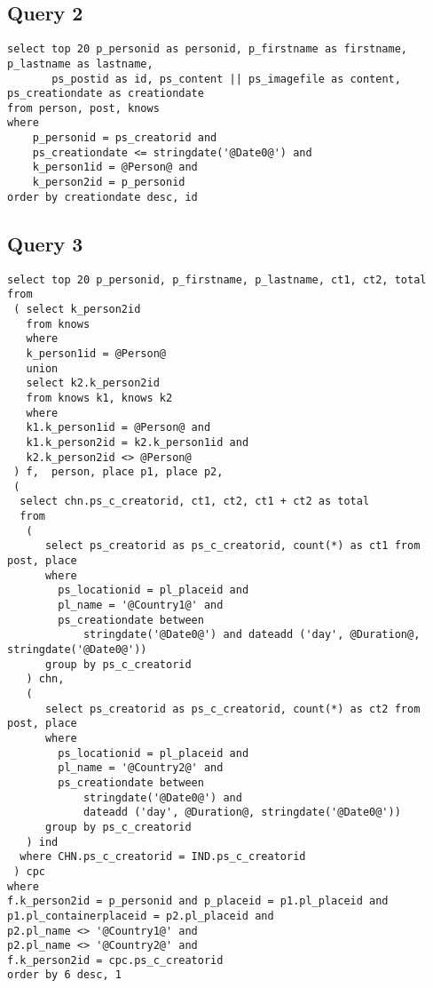 \subsection{Query 2}
\begin{verbatim}
select top 20 p_personid as personid, p_firstname as firstname, p_lastname as lastname,
       ps_postid as id, ps_content || ps_imagefile as content, ps_creationdate as creationdate
from person, post, knows
where
    p_personid = ps_creatorid and
    ps_creationdate <= stringdate('@Date0@') and
    k_person1id = @Person@ and
    k_person2id = p_personid
order by creationdate desc, id
\end{verbatim}

\subsection{Query 3}

\begin{verbatim}
select top 20 p_personid, p_firstname, p_lastname, ct1, ct2, total
from
 ( select k_person2id
   from knows
   where
   k_person1id = @Person@
   union
   select k2.k_person2id
   from knows k1, knows k2
   where
   k1.k_person1id = @Person@ and 
   k1.k_person2id = k2.k_person1id and 
   k2.k_person2id <> @Person@
 ) f,  person, place p1, place p2,
 (
  select chn.ps_c_creatorid, ct1, ct2, ct1 + ct2 as total
  from
   (
      select ps_creatorid as ps_c_creatorid, count(*) as ct1 from post, place
      where
        ps_locationid = pl_placeid and 
        pl_name = '@Country1@' and
        ps_creationdate between 
            stringdate('@Date0@') and dateadd ('day', @Duration@, stringdate('@Date0@'))
      group by ps_c_creatorid
   ) chn,
   (
      select ps_creatorid as ps_c_creatorid, count(*) as ct2 from post, place
      where
        ps_locationid = pl_placeid and 
        pl_name = '@Country2@' and
        ps_creationdate between 
            stringdate('@Date0@') and 
            dateadd ('day', @Duration@, stringdate('@Date0@'))
      group by ps_c_creatorid
   ) ind
  where CHN.ps_c_creatorid = IND.ps_c_creatorid
 ) cpc
where
f.k_person2id = p_personid and p_placeid = p1.pl_placeid and
p1.pl_containerplaceid = p2.pl_placeid and 
p2.pl_name <> '@Country1@' and 
p2.pl_name <> '@Country2@' and
f.k_person2id = cpc.ps_c_creatorid
order by 6 desc, 1
\end{verbatim}
 

